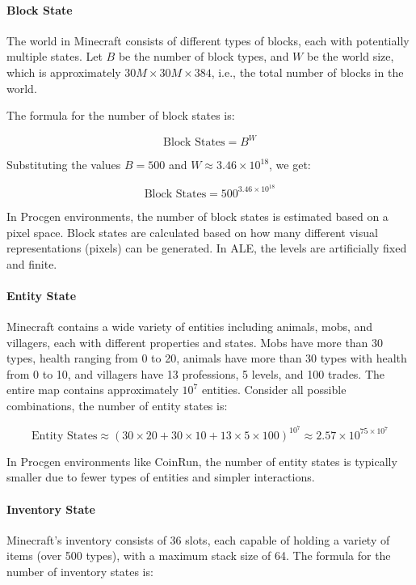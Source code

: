 \paragraph{Block State}

The world in Minecraft consists of different types of blocks, each with potentially multiple states. Let \( B \) be the number of block types, and \( W \) be the world size, which is approximately \( 30M \times 30M \times 384 \), i.e., the total number of blocks in the world.

The formula for the number of block states is:

\[
\text{Block States} = B^{W}
\]

Substituting the values \( B = 500 \) and \( W \approx 3.46 \times 10^{18} \), we get:

\[
\text{Block States} = 500^{3.46 \times 10^{18}}
\]

In Procgen environments, the number of block states is estimated based on a pixel space. Block states are calculated based on how many different visual representations (pixels) can be generated. In ALE, the levels are artificially fixed and finite.



\paragraph{Entity State}

Minecraft contains a wide variety of entities including animals, mobs, and villagers, each with different properties and states. Mobs have more than 30 types, health ranging from 0 to 20, animals have more than 30 types with health from 0 to 10, and villagers have 13 professions, 5 levels, and 100 trades. The entire map contains approximately $10^7$ entities. Consider all possible combinations, the number of entity states is:

\[
\text{Entity States} \approx (30 \times 20 + 30 \times 10 + 13 \times 5 \times 100)^{10^7} \approx 2.57 \times 10^{75 \times 10^7}
\]

In Procgen environments like CoinRun, the number of entity states is typically smaller due to fewer types of entities and simpler interactions.



\paragraph{Inventory State}

Minecraft's inventory consists of 36 slots, each capable of holding a variety of items (over 500 types), with a maximum stack size of 64. The formula for the number of inventory states is:

